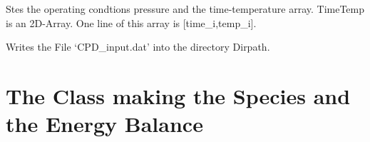 \documentclass[letterpaper,10pt,english]{sphinxmanual}
\begin{document}
\begin{fulllineitems}
\begin{fulllineitems}
\end{fulllineitems}


\begin{fulllineitems}
\label{CPDClasses:CPD_Fit_lin_regr.SetterAndLauncher.SetOperateCond}
Stes the operating condtions pressure and the time-temperature array. TimeTemp is an 2D-Array. One line of this array is {[}time\_i,temp\_i{]}.

\end{fulllineitems}


\begin{fulllineitems}
\label{CPDClasses:CPD_Fit_lin_regr.SetterAndLauncher.writeInstructFile}
Writes the File `CPD\_input.dat' into the directory Dirpath.

\end{fulllineitems}


\end{fulllineitems}



\section{The Class making the Species and the Energy Balance}
\label{CPDClasses:the-class-making-the-species-and-the-energy-balance}
\end{document}
